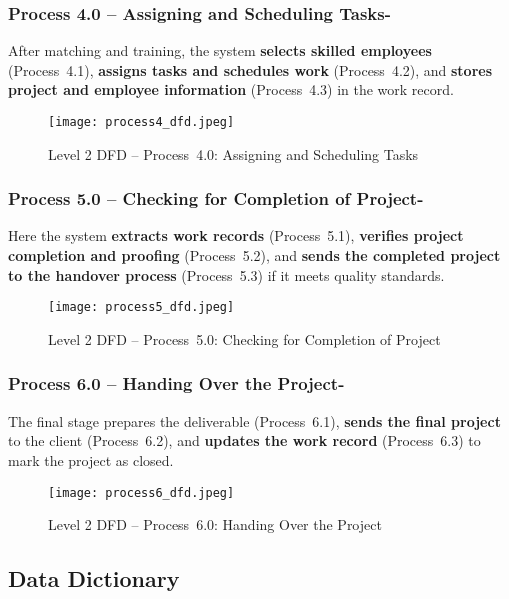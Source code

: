 \documentclass[12pt,a4paper]{article}
\begin{document}
\subsubsection*{Process 4.0 – Assigning and Scheduling Tasks-}
\noindent
After matching and training, the system \textbf{selects skilled employees} (Process 4.1), \textbf{assigns tasks and schedules work} (Process 4.2), and \textbf{stores project and employee information} (Process 4.3) in the work record.

\begin{figure}[H]
    \centering
    \texttt{[image: process4\_dfd.jpeg]}
    \caption{Level 2 DFD – Process 4.0: Assigning and Scheduling Tasks}
    \label{fig:level2_process4}
\end{figure}

\subsubsection*{Process 5.0 – Checking for Completion of Project-}
\noindent
Here the system \textbf{extracts work records} (Process 5.1), \textbf{verifies project completion and proofing} (Process 5.2), and \textbf{sends the completed project to the handover process} (Process 5.3) if it meets quality standards.

\begin{figure}[H]
    \centering
    \texttt{[image: process5\_dfd.jpeg]}
    \caption{Level 2 DFD – Process 5.0: Checking for Completion of Project}
    \label{fig:level2_process5}
\end{figure}

\subsubsection*{Process 6.0 – Handing Over the Project-}
\noindent
The final stage prepares the deliverable (Process 6.1), \textbf{sends the final project} to the client (Process 6.2), and \textbf{updates the work record} (Process 6.3) to mark the project as closed.

\begin{figure}[H]
    \centering
    \texttt{[image: process6\_dfd.jpeg]}
    \caption{Level 2 DFD – Process 6.0: Handing Over the Project}
    \label{fig:level2_process6}
\end{figure}


\subsection{Data Dictionary}
\end{document}
